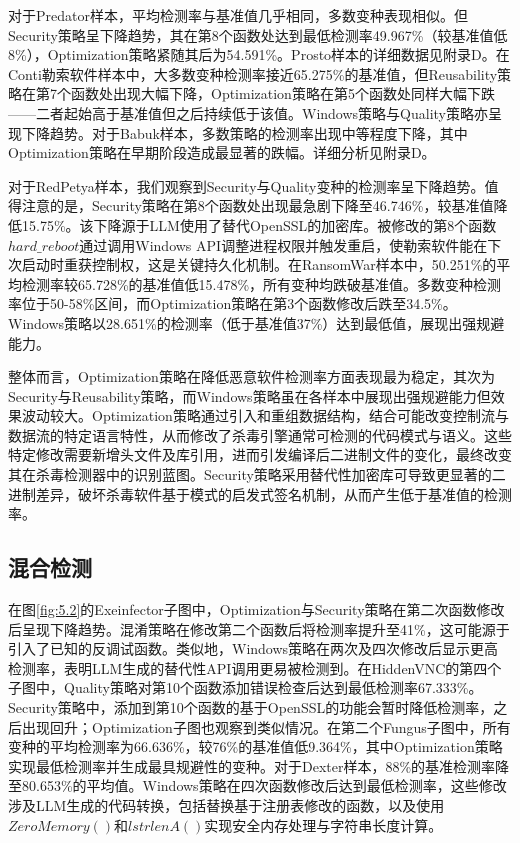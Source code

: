 对于Predator样本，平均检测率与基准值几乎相同，多数变种表现相似。但Security策略呈下降趋势，其在第8个函数处达到最低检测率49.967\%（较基准值低8\%），Optimization策略紧随其后为54.591\%。Prosto样本的详细数据见附录D。在Conti勒索软件样本中，大多数变种检测率接近65.275\%的基准值，但Reusability策略在第7个函数处出现大幅下降，Optimization策略在第5个函数处同样大幅下跌——二者起始高于基准值但之后持续低于该值。Windows策略与Quality策略亦呈现下降趋势。对于Babuk样本，多数策略的检测率出现中等程度下降，其中Optimization策略在早期阶段造成最显著的跌幅。详细分析见附录D。

对于RedPetya样本，我们观察到Security与Quality变种的检测率呈下降趋势。值得注意的是，Security策略在第8个函数处出现最急剧下降至46.746\%，较基准值降低15.75\%。该下降源于LLM使用了替代OpenSSL的加密库。被修改的第8个函数$hard\_reboot$通过调用Windows API调整进程权限并触发重启，使勒索软件能在下次启动时重获控制权，这是关键持久化机制。在RansomWar样本中，50.251\%的平均检测率较65.728\%的基准值低15.478\%，所有变种均跌破基准值。多数变种检测率位于50-58\%区间，而Optimization策略在第3个函数修改后跌至34.5\%。Windows策略以28.651\%的检测率（低于基准值37\%）达到最低值，展现出强规避能力。

整体而言，Optimization策略在降低恶意软件检测率方面表现最为稳定，其次为Security与Reusability策略，而Windows策略虽在各样本中展现出强规避能力但效果波动较大。Optimization策略通过引入和重组数据结构，结合可能改变控制流与数据流的特定语言特性，从而修改了杀毒引擎通常可检测的代码模式与语义。这些特定修改需要新增头文件及库引用，进而引发编译后二进制文件的变化，最终改变其在杀毒检测器中的识别蓝图。Security策略采用替代性加密库可导致更显著的二进制差异，破坏杀毒软件基于模式的启发式签名机制，从而产生低于基准值的检测率。

\subsection{混合检测}
在图\ref{fig:5.2}的Exeinfector子图中，Optimization与Security策略在第二次函数修改后呈现下降趋势。混淆策略在修改第二个函数后将检测率提升至41\%，这可能源于引入了已知的反调试函数。类似地，Windows策略在两次及四次修改后显示更高检测率，表明LLM生成的替代性API调用更易被检测到。在HiddenVNC的第四个子图中，Quality策略对第10个函数添加错误检查后达到最低检测率67.333\%。Security策略中，添加到第10个函数的基于OpenSSL的功能会暂时降低检测率，之后出现回升；Optimization子图也观察到类似情况。在第二个Fungus子图中，所有变种的平均检测率为66.636\%，较76\%的基准值低9.364\%，其中Optimization策略实现最低检测率并生成最具规避性的变种。对于Dexter样本，88\%的基准检测率降至80.653\%的平均值。Windows策略在四次函数修改后达到最低检测率，这些修改涉及LLM生成的代码转换，包括替换基于注册表修改的函数，以及使用$ZeroMemory()$和$lstrlenA()$实现安全内存处理与字符串长度计算。

